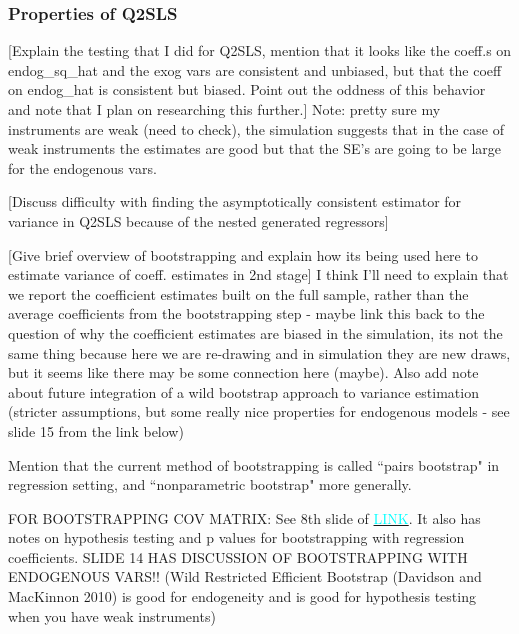 \documentclass[12pt]{article}
\begin{document}
\subsubsection{Properties of Q2SLS}
\textcolor{BrickRed}{[Explain the testing that I did for Q2SLS, mention that it looks like the coeff.s on endog\_sq\_hat and the exog vars are consistent and unbiased, but that the coeff on endog\_hat is consistent but biased. Point out the oddness of this behavior and note that I plan on researching this further.]} Note: pretty sure my instruments are weak (need to check), the simulation suggests that in the case of weak instruments the estimates are good but that the SE's are going to be large for the endogenous vars.

\textcolor{BrickRed}{[Discuss difficulty with finding the asymptotically consistent estimator for variance in Q2SLS because of the nested generated regressors]}

\textcolor{BrickRed}{[Give brief overview of bootstrapping and explain how its being used here to estimate variance of coeff. estimates in 2nd stage]} I think I'll need to explain that we report the coefficient estimates built on the full sample, rather than the average coefficients from the bootstrapping step - maybe link this back to the question of why the coefficient estimates are biased in the simulation, its not the same thing because here we are re-drawing and in simulation they are new draws, but it seems like there may be some connection here (maybe). Also add note about future integration of a wild bootstrap approach to variance estimation (stricter assumptions, but some really nice properties for endogenous models - see slide 15 from the link below)

Mention that the current method of bootstrapping is called ``pairs bootstrap" in regression setting, and ``nonparametric bootstrap" more generally.

\textcolor{BrickRed}{FOR BOOTSTRAPPING COV MATRIX:} See 8th slide of \href{https://www.math.kth.se/matstat/gru/sf2930/papers/wild.bootstrap.pdf}{\textcolor{cyan}{LINK}}. It also has notes on hypothesis testing and p values for bootstrapping with regression coefficients. SLIDE 14 HAS DISCUSSION OF BOOTSTRAPPING WITH ENDOGENOUS VARS!! (Wild Restricted Efficient Bootstrap (Davidson and MacKinnon 2010) is good for endogeneity and is good for hypothesis testing when you have weak instruments)

\end{document}
